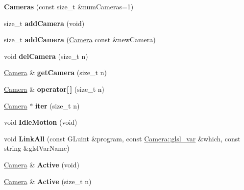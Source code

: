 \begin{DoxyCompactItemize}
\item 
\hypertarget{class_cameras_a35c195ae1a970836e7192bac0f34fb54}{{\bfseries Cameras} (const size\-\_\-t \&num\-Cameras=1)}\label{class_cameras_a35c195ae1a970836e7192bac0f34fb54}

\item 
\hypertarget{class_cameras_ae6eb54cc68dd582db6f808a603031c56}{size\-\_\-t {\bfseries add\-Camera} (void)}\label{class_cameras_ae6eb54cc68dd582db6f808a603031c56}

\item 
\hypertarget{class_cameras_ac5292f6f0d6c151390e5564548b72935}{size\-\_\-t {\bfseries add\-Camera} (\hyperlink{class_camera}{Camera} const \&new\-Camera)}\label{class_cameras_ac5292f6f0d6c151390e5564548b72935}

\item 
\hypertarget{class_cameras_aaa690f1a47ebe431dbda55fba958ca38}{void {\bfseries del\-Camera} (size\-\_\-t n)}\label{class_cameras_aaa690f1a47ebe431dbda55fba958ca38}

\item 
\hypertarget{class_cameras_a0e5181cf91f009ae2709533f2184ddb0}{\hyperlink{class_camera}{Camera} \& {\bfseries get\-Camera} (size\-\_\-t n)}\label{class_cameras_a0e5181cf91f009ae2709533f2184ddb0}

\item 
\hypertarget{class_cameras_aeee13e4cc6eb085a65af9ef6bf3a549a}{\hyperlink{class_camera}{Camera} \& {\bfseries operator\mbox{[}$\,$\mbox{]}} (size\-\_\-t n)}\label{class_cameras_aeee13e4cc6eb085a65af9ef6bf3a549a}

\item 
\hypertarget{class_cameras_a91bd6744be5f876bd74e65134da8653a}{\hyperlink{class_camera}{Camera} $\ast$ {\bfseries iter} (size\-\_\-t n)}\label{class_cameras_a91bd6744be5f876bd74e65134da8653a}

\item 
\hypertarget{class_cameras_acb3907c96b7d147b7bcc1aad42f8da6f}{void {\bfseries Idle\-Motion} (void)}\label{class_cameras_acb3907c96b7d147b7bcc1aad42f8da6f}

\item 
\hypertarget{class_cameras_a5300fe1aefc42b41151dbb55aff1c978}{void {\bfseries Link\-All} (const G\-Luint \&program, const \hyperlink{class_camera_a6ff726a75a430e4f17e5dec42e4d4405}{Camera\-::glsl\-\_\-var} \&which, const string \&glsl\-Var\-Name)}\label{class_cameras_a5300fe1aefc42b41151dbb55aff1c978}

\item 
\hypertarget{class_cameras_a66a0741c023da5ef362f501ea255d65e}{\hyperlink{class_camera}{Camera} \& {\bfseries Active} (void)}\label{class_cameras_a66a0741c023da5ef362f501ea255d65e}

\item 
\hypertarget{class_cameras_a8e6b90d6a3f2b3654ee02c703172c98d}{\hyperlink{class_camera}{Camera} \& {\bfseries Active} (size\-\_\-t n)}\label{class_cameras_a8e6b90d6a3f2b3654ee02c703172c98d}

\end{DoxyCompactItemize}
